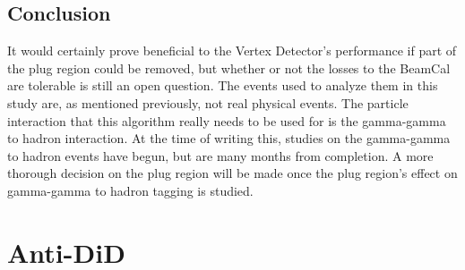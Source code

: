 \documentclass{report}
\begin{document}
            \subsection{Conclusion} 
                 It would certainly prove beneficial to the Vertex Detector's performance if part of the plug region could be removed, but whether or not the losses to the BeamCal are tolerable is still an open question. The events used to analyze them in this study are, as mentioned previously, not real physical events. The particle interaction that this algorithm really needs to be used for is the gamma-gamma to hadron interaction. At the time of writing this, studies on the gamma-gamma to hadron events have begun, but are many months from completion. A more thorough decision on the plug region will be made once the plug region's effect on gamma-gamma to hadron tagging is studied.

        
        \section{Anti-DiD}
\end{document}
